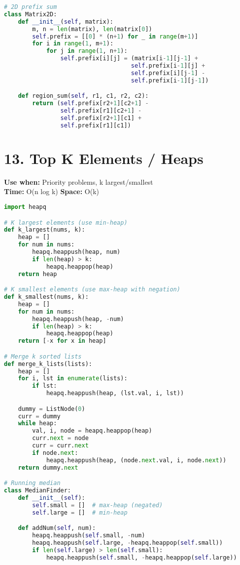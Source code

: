 \documentclass[8pt,landscape]{article}
\begin{document}
\begin{multicols}{3}
\begin{lstlisting}[language=Python]
# 2D prefix sum
class Matrix2D:
    def __init__(self, matrix):
        m, n = len(matrix), len(matrix[0])
        self.prefix = [[0] * (n+1) for _ in range(m+1)]
        for i in range(1, m+1):
            for j in range(1, n+1):
                self.prefix[i][j] = (matrix[i-1][j-1] +
                                    self.prefix[i-1][j] +
                                    self.prefix[i][j-1] -
                                    self.prefix[i-1][j-1])

    def region_sum(self, r1, c1, r2, c2):
        return (self.prefix[r2+1][c2+1] -
                self.prefix[r1][c2+1] -
                self.prefix[r2+1][c1] +
                self.prefix[r1][c1])
\end{lstlisting}

\section*{13. Top K Elements / Heaps}
\textbf{Use when:} Priority problems, k largest/smallest \\
\textbf{Time:} O(n log k) \quad \textbf{Space:} O(k)
\begin{lstlisting}[language=Python]
import heapq

# K largest elements (use min-heap)
def k_largest(nums, k):
    heap = []
    for num in nums:
        heapq.heappush(heap, num)
        if len(heap) > k:
            heapq.heappop(heap)
    return heap

# K smallest elements (use max-heap with negation)
def k_smallest(nums, k):
    heap = []
    for num in nums:
        heapq.heappush(heap, -num)
        if len(heap) > k:
            heapq.heappop(heap)
    return [-x for x in heap]

# Merge k sorted lists
def merge_k_lists(lists):
    heap = []
    for i, lst in enumerate(lists):
        if lst:
            heapq.heappush(heap, (lst.val, i, lst))

    dummy = ListNode(0)
    curr = dummy
    while heap:
        val, i, node = heapq.heappop(heap)
        curr.next = node
        curr = curr.next
        if node.next:
            heapq.heappush(heap, (node.next.val, i, node.next))
    return dummy.next

# Running median
class MedianFinder:
    def __init__(self):
        self.small = []  # max-heap (negated)
        self.large = []  # min-heap

    def addNum(self, num):
        heapq.heappush(self.small, -num)
        heapq.heappush(self.large, -heapq.heappop(self.small))
        if len(self.large) > len(self.small):
            heapq.heappush(self.small, -heapq.heappop(self.large))


\end{lstlisting}
\end{multicols}
\end{document}
